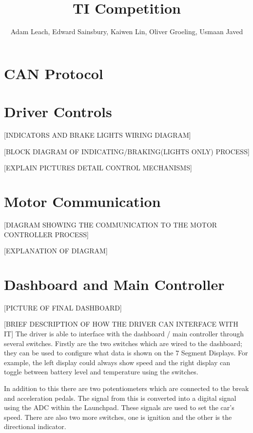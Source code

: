 \documentclass[10pt,a4paper]{article}
\begin{document}
\title{TI Competition}
\author{Adam Leach, Edward Sainsbury, Kaiwen Lin, Oliver Groeling, Usmaan Javed}
\maketitle
\tableofcontents
\section{CAN Protocol}
\section{Driver Controls}
[INDICATORS AND BRAKE LIGHTS WIRING DIAGRAM]

[BLOCK DIAGRAM OF INDICATING/BRAKING(LIGHTS ONLY) PROCESS]

[EXPLAIN PICTURES DETAIL CONTROL MECHANISMS]

\section{Motor Communication}
[DIAGRAM SHOWING THE COMMUNICATION TO THE MOTOR CONTROLLER PROCESS]

[EXPLANATION OF DIAGRAM]

\section{Dashboard and Main Controller}
[PICTURE OF FINAL DASHBOARD]

[BRIEF DESCRIPTION OF HOW THE DRIVER CAN INTERFACE WITH IT]
The driver is able to interface with the dashboard / main controller through several switches. Firstly are the two switches which are wired to the dashboard; they can be used to configure what data is shown on the $7$ Segment Displays. For example, the left display could always show speed and the right display can toggle between battery level and temperature using the switches.

In addition to this there are two potentiometers which are connected to the break and acceleration pedals. The signal from this is converted into a digital signal using the ADC within the Launchpad. These signals are used to set the car's speed. There are also two more switches, one is ignition and the other is the directional indicator.
\end{document}
